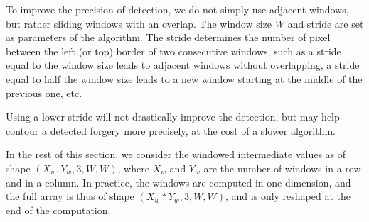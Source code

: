 \documentclass{ipol}
\begin{document}
To improve the precision of detection, we do not simply use adjacent windows, but rather sliding windows with an overlap. The window size $W$ and stride are set as parameters of the algorithm. The stride determines the number of pixel between the left (or top) border of two consecutive windows, such as a stride equal to the window size leads to adjacent windows without overlapping, a stride equal to half the window size leads to a new window starting at the middle of the previous one, etc.

Using a lower stride will not drastically improve the detection, but may help contour a detected forgery more precisely, at the cost of a slower algorithm.

In the rest of this section, we consider the windowed intermediate values as of shape $(X_w, Y_w, 3, W, W)$, where $X_w$ and $Y_w$ are the number of windows in a row and in a column. In practice, the windows are computed in one dimension, and the full array is thus of shape $(X_w*Y_w, 3, W, W)$, and is only reshaped at the end of the computation.
\end{document}
